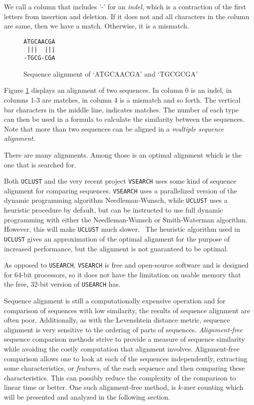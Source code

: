 We call a column that includes '-' for an \emph{indel}, which is a contraction
of the first letters from insertion and deletion. If it does not and all
characters in the column are same, then we have a match. Otherwise, it is a
mismatch.

\begin{figure}[H]
  \centering
  \verb+ATGCAACGA+ \\
  \verb+ |||  |||+ \\
  \verb+-TGCG-CGA+
  \caption{Sequence alignment of `ATGCAACGA' and `TGCGCGA'}
  \label{fig:seqAlignment}
\end{figure}

Figure \ref{fig:seqAlignment} displays an alignment of two sequences. In column
0 is an indel, in columns 1-3 are matches, in column 4 is a mismatch and so
forth. The vertical bar characters in the middle line, indicates matches. The
number of each type can then be used in a formula to calculate the similarity
between the sequences. Note that more than two sequences can be aligned in a
\emph{multiple sequence alignment}.

There are many alignments. Among those is an optimal alignment which is the one
that is searched for.

Both \texttt{UCLUST} and the very recent project \texttt{VSEARCH} uses some
kind of sequence alignment for comparing sequences. \texttt{VSEARCH} uses a
parallelized version of the dynamic programming algorithm Needleman-Wunsch,
while \texttt{UCLUST} uses a heuristic procedure by default, but can be
instructed to use full dynamic programming with either the Needleman-Wunsch or
Smith-Waterman algorithm. However, this will make \texttt{UCLUST} much
slower.~\cite{vsearch} The heuristic algorithm used in \texttt{UCLUST} gives an
approximation of the optimal alignment for the purpose of increased
performance, but the alignment is not guaranteed to be optimal.

As opposed to \texttt{USEARCH}, \texttt{VSEARCH} is free and open-source
software and is designed for 64-bit processors, so it does not have the
limitation on usable memory that the free, 32-bit version of \texttt{USEARCH}
has.

Sequence alignment is still a computationally expensive operation and for
comparison of sequences with low similarity, the results of sequence alignment
are often poor. Additionally, as with the Levenshtein distance metric, sequence
alignment is very sensitive to the ordering of parts of sequences.
\emph{Alignment-free} sequence comparison methods strive to provide a measure
of sequence similarity while avoiding the costly computation that alignment
involves. Alignment-free comparison allows one to look at each of the sequences
independently, extracting some characteristics, or \emph{features}, of the each
sequence and then comparing these characteristics.  This can possibly reduce
the complexity of the comparison to linear time or better. One such
alignment-free method, is $k$-mer counting which will be presented and analyzed
in the following section.


